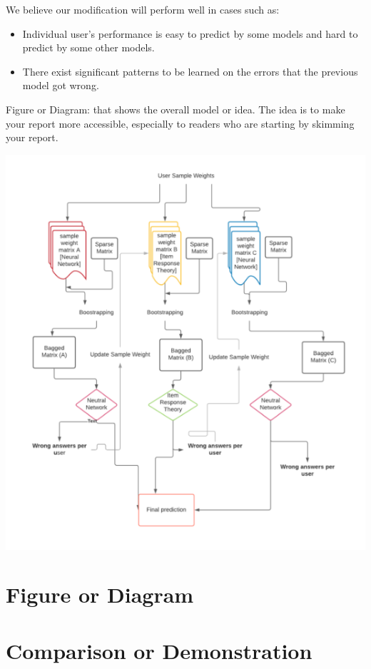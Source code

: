 \documentclass{article}
\begin{document}
    We believe our modification will perform well in cases such as:
    \begin{itemize}
        \item Individual user's performance is easy to predict by some models and hard to predict by some other models.
        \item There exist significant patterns to be learned on the errors that the previous model got wrong. 
    \end{itemize}

    Figure or Diagram: that shows the overall model or idea. The idea is to make your report more accessible, especially to readers who are starting by skimming your report.

    \includegraphics[scale=0.55]{figures/pb_f3.png}

    \section{Figure or Diagram}
    \section{Comparison or Demonstration}
\end{document}
